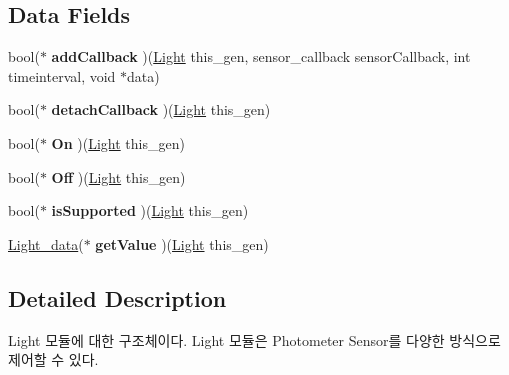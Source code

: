 \subsection*{Data Fields}
\begin{DoxyCompactItemize}
\item 
\hypertarget{struct__Light_a19d8cdc385ba4580fbcb3ee5bcc8a205}{bool($\ast$ {\bfseries add\-Callback} )(\hyperlink{struct__Light}{Light} this\-\_\-gen, sensor\-\_\-callback sensor\-Callback, int timeinterval, void $\ast$data)}\label{struct__Light_a19d8cdc385ba4580fbcb3ee5bcc8a205}

\item 
\hypertarget{struct__Light_a44871cb3704cf4def2da008e9817f37c}{bool($\ast$ {\bfseries detach\-Callback} )(\hyperlink{struct__Light}{Light} this\-\_\-gen)}\label{struct__Light_a44871cb3704cf4def2da008e9817f37c}

\item 
\hypertarget{struct__Light_a9cb421ec546d7fa26237e97964b5797c}{bool($\ast$ {\bfseries On} )(\hyperlink{struct__Light}{Light} this\-\_\-gen)}\label{struct__Light_a9cb421ec546d7fa26237e97964b5797c}

\item 
\hypertarget{struct__Light_af8bc651cce8a249b5e19efac20b8fea6}{bool($\ast$ {\bfseries Off} )(\hyperlink{struct__Light}{Light} this\-\_\-gen)}\label{struct__Light_af8bc651cce8a249b5e19efac20b8fea6}

\item 
\hypertarget{struct__Light_a26d33e377912ff1d4fc10f17c512231b}{bool($\ast$ {\bfseries is\-Supported} )(\hyperlink{struct__Light}{Light} this\-\_\-gen)}\label{struct__Light_a26d33e377912ff1d4fc10f17c512231b}

\item 
\hypertarget{struct__Light_a167b8ee698bc8f2db75089756d4d58d3}{\hyperlink{Sensor_8h_d2/d77/struct__Light__data}{Light\-\_\-data}($\ast$ {\bfseries get\-Value} )(\hyperlink{struct__Light}{Light} this\-\_\-gen)}\label{struct__Light_a167b8ee698bc8f2db75089756d4d58d3}

\end{DoxyCompactItemize}


\subsection{Detailed Description}
Light 모듈에 대한 구조체이다. Light 모듈은 Photometer Sensor를 다양한 방식으로 제어할 수 있다. 

